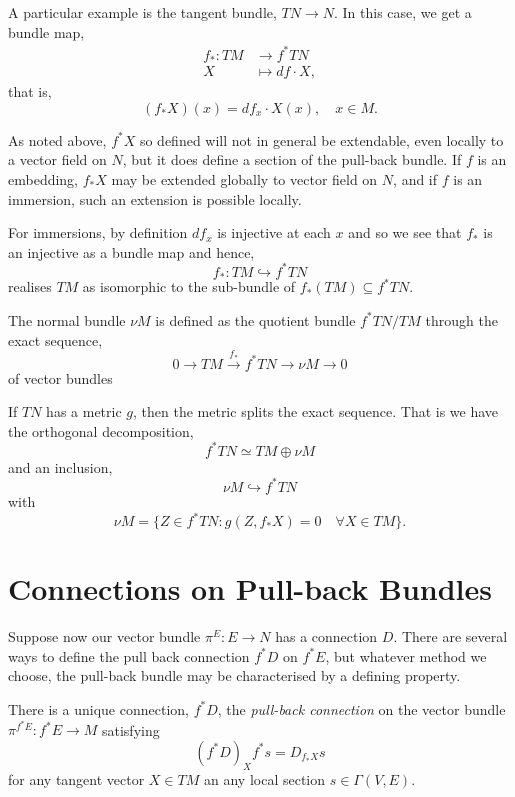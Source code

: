 \documentclass{amsart}
\begin{document}
\begin{example}
A particular example is the tangent bundle, \(TN \to N\). In this case, we get a bundle map,
\begin{align*}
f_{\ast} : TM &\to f^{\ast} TN \\
X &\mapsto df \cdot X,
\end{align*}
that is,
\[
(f_{\ast} X) (x) = df_{x} \cdot X(x), \quad x \in M.
\]

As noted above, \(f^{\ast} X\) so defined will not in general be extendable, even locally to a vector field on \(N\), but it does define a section of the pull-back bundle. If \(f\) is an embedding, \(f_{\ast} X\) may be extended globally to vector field on \(N\), and if \(f\) is an immersion, such an extension is possible locally.

For immersions, by definition \(df_x\) is injective at each \(x\) and so we see that \(f_{\ast}\) is an injective as a bundle map and hence,
\[
f_{\ast} : TM \hookrightarrow f^{\ast} TN
\]
realises \(TM\) as isomorphic to the sub-bundle of \(f_{\ast} (TM) \subseteq f^{\ast} TN\).

The normal bundle \(\nu M\) is defined as the quotient bundle \(f^{\ast} TN/TM\) through the exact sequence,
\[
0 \to TM \overset{f_{\ast}}{\to} f^{\ast} TN \to \nu M \to 0
\]
of vector bundles

If \(TN\) has a metric \(g\), then the metric splits the exact sequence. That is we have the orthogonal decomposition,
\[
f^{\ast} TN \simeq TM \oplus \nu M
\]
and an inclusion,
\[
\nu M \hookrightarrow f^{\ast} TN
\]
with
\[
\nu M = \{Z \in f^{\ast}TN : g(Z, f_{\ast} X) = 0 \quad \forall X \in TM\}.
\]
\end{example}

\section{Connections on Pull-back Bundles}

Suppose now our vector bundle \(\pi^E : E \to N\) has a connection \(D\). There are several ways to define the pull back connection \(f^{\ast} D\) on \(f^{\ast} E\), but whatever method we choose, the pull-back bundle may be characterised by a defining property.

\begin{lemma}
\label{lem:pullback_connection}
There is a unique connection, \(f^{\ast} D\), the \emph{pull-back connection} on the vector bundle \(\pi^{f^{\ast} E} : f^{\ast}E \to M\) satisfying
\[
(f^{\ast} D)_X f^{\ast} s = D_{f_{\ast} X} s
\]
for any tangent vector \(X \in TM\) an any local section \(s \in \Gamma(V, E)\).
\end{lemma}
\end{document}
